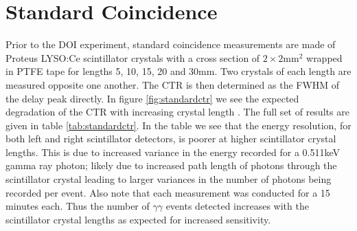 \section{Standard Coincidence}
\label{sec:standardctr}
Prior to the DOI experiment, standard coincidence measurements are made of Proteus LYSO:Ce scintillator crystals with a cross section of $2\times2$mm$^2$ wrapped in PTFE tape for lengths 5, 10, 15, 20 and 30mm. Two crystals of each length are measured opposite one another. The CTR is then determined as the FWHM of the delay peak directly. In figure \ref{fig:standardctr} we see the expected degradation of the CTR with increasing crystal length \cite{r_Paganoni_Pauwels_et_al__2011}\cite{Wiener_Kaul_Surti_Karp_2010}\cite{Choong_2009}\cite{Gola_Piemonte_Tarolli_2013}\cite{o_Pro_Serra_Tarolli_Zorzi_2011}. The full set of results are given in table \ref{tab:standardctr}. In the table we see that the energy resolution, for both left and right scintillator detectors, is poorer at higher scintillator crystal lengths. This is due to increased variance in the energy recorded for a 0.511keV gamma ray photon; likely due to increased path length of photons through the scintillator crystal leading to larger variances in the number of photons being recorded per event. Also note that each measurement was conducted for a 15 minutes each. Thus the number of $\gamma\gamma$ events detected increases with the scintillator crystal lengths as expected for increased sensitivity.